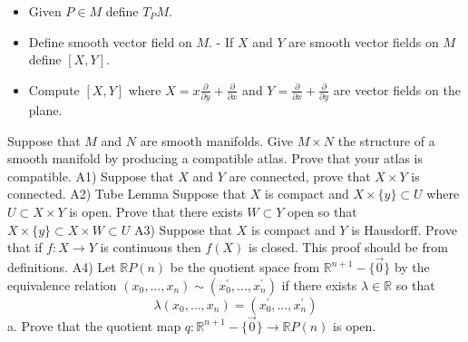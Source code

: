 \documentclass[14pt]{extarticle}
\begin{document}
\begin{itemize}
  \item Given $P \in M$ define $T_{P} M$.

  \item Define smooth vector field on $M$. - If $X$ and $Y$ are smooth vector fields on $M$ define $[X, Y]$.

  \item Compute $[X, Y]$ where $X=x \frac{\partial}{\partial y}+\frac{\partial}{\partial x}$ and $Y=\frac{\partial}{\partial x}+\frac{\partial}{\partial y}$ are vector fields on the plane.

\end{itemize}
\newpage
 Suppose that $M$ and $N$ are smooth manifolds. Give $M \times N$ the structure of a smooth manifold by producing a compatible atlas. Prove that your atlas is compatible.
\newpage
A1) Suppose that $X$ and $Y$ are connected, prove that $X \times Y$ is connected.
\newpage
A2) Tube Lemma Suppose that $X$ is compact and $X \times\{y\} \subset U$ where $U \subset X \times Y$ is open. Prove that there exists $W \subset Y$ open so that $X \times\{y\} \subset X \times W \subset U$
\newpage
A3) Suppose that $X$ is compact and $Y$ is Hausdorff. Prove that if $f: X \rightarrow Y$ is continuous then $f(X)$ is closed. This proof should be from definitions.
\newpage
A4) Let $\mathbb{R} P(n)$ be the quotient space from $\mathbb{R}^{n+1}-\{\overrightarrow{0}\}$ by the equivalence relation $\left(x_{0}, \ldots, x_{n}\right) \sim\left(x_{0}^{\prime}, \ldots, x_{n}^{\prime}\right)$ if there exists $\lambda \in \mathbb{R}$ so that
$$
\lambda\left(x_{0}, \ldots, x_{n}\right)=\left(x_{0}^{\prime}, \ldots, x_{n}^{\prime}\right)
$$
a. Prove that the quotient map $q: \mathbb{R}^{n+1}-\{\overrightarrow{0}\} \rightarrow \mathbb{R} P(n)$ is open.
\end{document}

